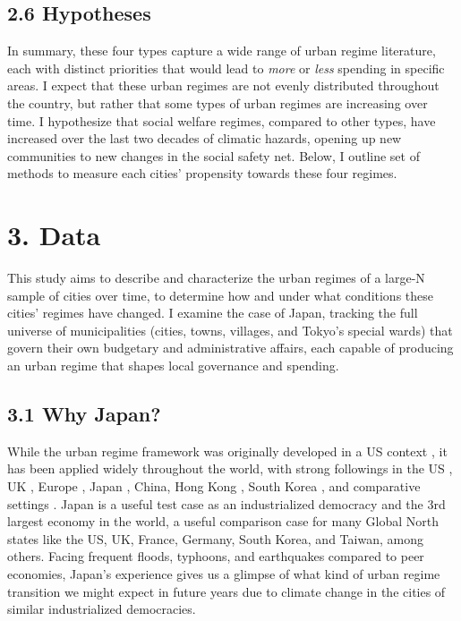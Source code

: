 \documentclass[preprint, 3p,
authoryear]{elsarticle} %
\begin{document}
\hypertarget{hypotheses}{%
\subsection{2.6 Hypotheses}\label{hypotheses}}

In summary, these four types capture a wide range of urban regime
literature, each with distinct priorities that would lead to \emph{more}
or \emph{less} spending in specific areas. I expect that these urban
regimes are not evenly distributed throughout the country, but rather
that some types of urban regimes are increasing over time. I hypothesize
that social welfare regimes, compared to other types, have increased
over the last two decades of climatic hazards, opening up new
communities to new changes in the social safety net. Below, I outline
set of methods to measure each cities' propensity towards these four
regimes.

\hypertarget{data}{%
\section{3. Data}\label{data}}

This study aims to describe and characterize the urban regimes of a
large-N sample of cities over time, to determine how and under what
conditions these cities' regimes have changed. I examine the case of
Japan, tracking the full universe of municipalities (cities, towns,
villages, and Tokyo's special wards) that govern their own budgetary and
administrative affairs, each capable of producing an urban regime that
shapes local governance and spending.

\hypertarget{why-japan}{%
\subsection{3.1 Why Japan?}\label{why-japan}}

While the urban regime framework was originally developed in a US
context \citep{stone_1989}, it has been applied widely throughout the
world, with strong followings in the US \citep{kilburn_2004}, UK
\citep{bassett_1996, davies_2017}, Europe
\citep{stoker_and_mossberger_1994, arbaci_2019}, Japan
\citep{hill_fujita_2000, saito_2003, sorensen_et_al_2010, tsukamoto_2012},
China, Hong Kong \citep{lai_and_chui_2014}, South Korea
\citep{shin_et_al_2015}, and comparative settings
\citep{mossberger_and_stoker_2001, ramirez_perez_et_al_2008}. Japan is a
useful test case as an industrialized democracy and the 3rd largest
economy in the world, a useful comparison case for many Global North
states like the US, UK, France, Germany, South Korea, and Taiwan, among
others. Facing frequent floods, typhoons, and earthquakes compared to
peer economies, Japan's experience gives us a glimpse of what kind of
urban regime transition we might expect in future years due to climate
change in the cities of similar industrialized democracies.
\end{document}
